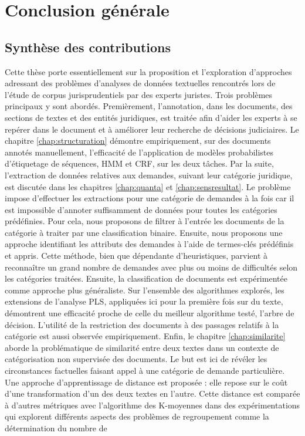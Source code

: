 \chapter*{Conclusion générale}
{}
\label{chap:conclusion}


\section{Synthèse des contributions}
\label{sec:conclusion:contributions}
Cette thèse  porte essentiellement sur la proposition et l'exploration d'approches adressant des problèmes d'analyses de données textuelles rencontrés lors de l'étude de corpus jurisprudentiels par des experts juristes. Trois problèmes principaux y sont abordés. Premièrement, l'annotation, dans les documents, des sections de textes et des entités juridiques, est traitée afin d'aider les experts à se repérer dans le document et à améliorer leur recherche de décisions judiciaires. Le chapitre \ref{chap:structuration}  démontre empiriquement, sur des documents annotés manuellement, l'efficacité de l'application de modèles probabilistes d'étiquetage de séquences, HMM et CRF, sur les deux tâches. Par la suite, l'extraction de données relatives aux demandes, suivant leur catégorie juridique, est discutée dans les chapitres \ref{chap:quanta} et \ref{chap:sensresultat}. Le problème impose d'effectuer les extractions pour une catégorie de demandes à la fois car il est impossible d'annoter suffisamment de données pour toutes les catégories prédéfinies. Pour cela, nous proposons de filtrer à l'entrée les documents de la catégorie à traiter par une classification binaire. Ensuite, nous proposons une approche  identifiant les attributs des demandes à l'aide de termes-clés prédéfinis et appris. Cette méthode, bien que dépendante d'heuristiques, parvient à reconnaître un grand nombre de demandes avec plus ou moins de difficultés selon les catégories traitées. Ensuite, la classification de documents est expérimentée comme approche plus généraliste. Sur l'ensemble des algorithmes explorés, les extensions de l'analyse PLS, appliquées ici pour la première fois sur du texte, démontrent une efficacité proche de celle du meilleur algorithme testé, l'arbre de décision. L'utilité de la restriction des documents à des passages relatifs à la catégorie est aussi observée empiriquement. Enfin, le chapitre \ref{chap:similarite} aborde la problématique de similarité entre deux textes dans un contexte de catégorisation non supervisée des documents. Le but est ici de révéler les circonstances factuelles faisant appel à une catégorie de demande particulière. Une approche d'apprentissage de distance est proposée : elle repose sur le coût d'une transformation d'un des deux textes en l'autre. Cette distance est comparée à d'autres métriques avec l'algorithme des K-moyennes dans des expérimentations qui explorent différents aspects des problèmes de regroupement comme la détermination du nombre de 